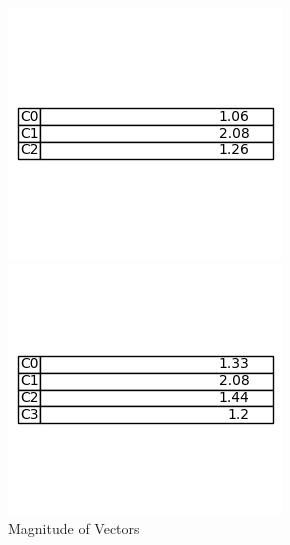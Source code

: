\documentclass[12pt]{article}
\begin{document}
\begin{figure}[ht]
    \centering
    \begin{minipage}{0.33\textwidth}
        \centering
        \includegraphics[width=\linewidth]{magnitude.png}
        \vspace{-2cm}
        \caption{Magnitude of Vectors}
        \label{fig:crosstalk}
    \end{minipage}\hfill
    \begin{minipage}{0.33\textwidth}
        \centering
        \includegraphics[width=\linewidth]{magnitude2.png}

\end{minipage}
\end{figure}
\end{document}

